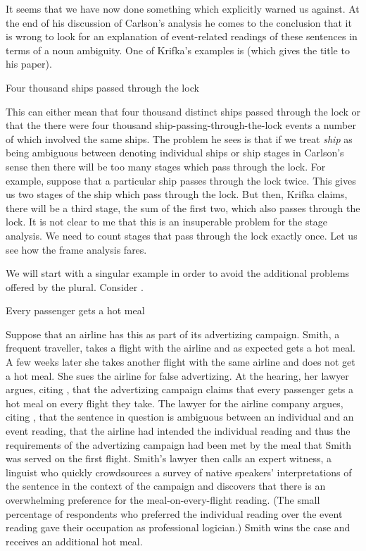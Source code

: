 It seems that we have now done something which \cite{Krifka1990}
explicitly warned us against.  At the end of his discussion of
Carlson's analysis he comes to the conclusion that it is wrong to look
for an explanation of event-related readings of these sentences in
terms of a noun ambiguity.  One of Krifka's examples is \nexteg{}
(which gives the title to his paper).
\begin{ex} 
Four thousand ships passed through the lock 
\end{ex} 
This can either mean that four thousand distinct ships passed through
the lock or that the there were four thousand
ship-passing-through-the-lock events a number of which involved the
same ships.  The problem he sees is that if we treat \textit{ship} as
being ambiguous between denoting individual ships or ship stages in
Carlson's sense then there will be too many stages which pass through
the lock.  For example, suppose that a particular ship passes through
the lock twice.  This gives us two stages of the ship which pass
through the lock.  But then, Krifka claims, there will be a third
stage, the sum of the first two, which also passes through the lock.
It is not clear to me that this is an insuperable problem for the
stage analysis.  We need to count stages that pass through the lock
exactly once.  Let us see how the frame analysis fares.

We will start with a singular example in order to avoid the additional
problems offered by the plural.  Consider \nexteg{}.
\begin{ex} 
Every passenger gets a hot meal 
\end{ex} 
Suppose that an airline has this as part of its advertizing campaign.
Smith, a frequent traveller,  takes a flight with the airline and as
expected gets a hot meal.  A few weeks later she takes another flight
with the same airline and does not get a hot meal.  She sues the
airline for false advertizing.  At the hearing, her lawyer argues,
citing \cite{Gupta1980}, that the advertizing campaign claims that
every passenger gets a hot meal on every flight they take.  The lawyer for the
airline company argues, citing \cite{Krifka1990}, that the sentence in
question is ambiguous between an individual and an event reading, that
the airline had intended the individual reading and thus the
requirements of the advertizing campaign had been met by the meal that
Smith was served on the first flight.  Smith's lawyer then calls an
expert witness, a linguist who quickly crowdsources a survey of native
speakers' interpretations of the sentence in the context of the
campaign and discovers that there is an overwhelming preference for
the meal-on-every-flight reading.  (The small percentage of
respondents who preferred the individual reading over the event
reading gave their occupation as professional logician.)  Smith wins
the case and receives an additional hot meal.


